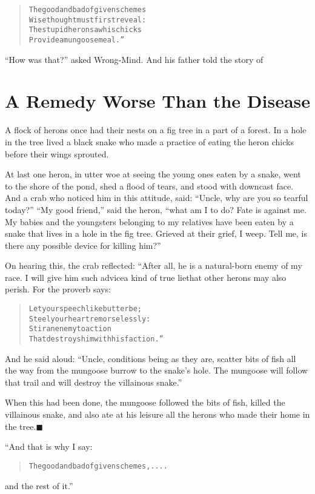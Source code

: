 \documentclass[article, twoside, 14pt]{memoir}
\newcommand{\qed}{\hfill \ensuremath{\blacksquare}}
\renewenvironment{verbatim}{%
\begin{quote}%
\vskip -10pt%
\begin{alltt}\normalfont\large}{\end{alltt}%
\end{quote}%
\vskip -10pt
} %
\begin{document}
\begin{verbatim}
The good and bad of given schemes
    Wise thought must first reveal:
The stupid heron saw his chicks
    Provide a mungoose meal.”
\end{verbatim}
``How was that?'' asked Wrong-Mind. And his father told the story
of

\chapter{A Remedy Worse Than the Disease}

\label{s30}

A flock of herons once had their nests on a fig tree in a part of a
forest. In a hole in the tree lived a black snake who made a
practice of eating the heron chicks before their wings sprouted.

At last one heron, in utter woe at seeing the young ones eaten by a
snake, went to the shore of the pond, shed a flood of tears, and
stood with downcast face. And a crab who noticed him in this
attitude, said: ``Uncle, why are you so tearful today?''
``My good friend,'' said the heron,
``what am I to do? Fate is against me. My babies and the youngsters belonging to my relatives have been eaten by a snake that lives in a hole in the fig tree. Grieved at their grief, I weep. Tell me, is there any possible device for killing him?''

On hearing this, the crab reflected: “After all, he is a
natural-born enemy of my race. I will give him such advice{\textemdash}a kind
of true lie{\textemdash}that other herons may also perish. For the proverb
says:

\begin{verbatim}
Let your speech like butter be;
Steel your heart remorselessly:
Stir an enemy to action
That destroys him with his faction.”
\end{verbatim}
And he said aloud:
``Uncle, conditions being as they are, scatter bits of fish all the way from the mungoose burrow to the snake's hole. The mungoose will follow that trail and will destroy the villainous snake.''

When this had been done, the mungoose followed the bits of fish,
killed the villainous snake, and also ate at his leisure all the
herons who made their home in the tree.\hyperref[s30]{\qed}

“And that is why I say:

\begin{verbatim}
The good and bad of given schemes, ....
\end{verbatim}
and the rest of it.”
\end{document}
